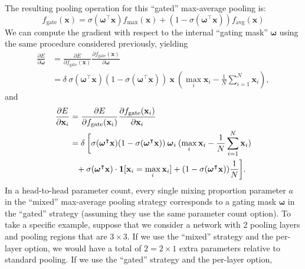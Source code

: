 \documentclass[twoside]{article}
\begin{document}
The resulting pooling operation for this ``gated'' max-average pooling is:  
{\footnotesize
\begin{equation}
   f_{\text{gate}}(\mathbf{\mathbf{x}}) = \sigma (\boldsymbol{\omega}^\intercal \mathbf{x}) f_{\text{max}}({\mathbf{x}})   + (1-\sigma(\boldsymbol{\omega}^\intercal \mathbf{x})) f_{\text{avg}}({\mathbf{x}})
\end{equation}
}%
We can compute the gradient with respect to the internal ``gating mask'' $\boldsymbol{\omega}$ 
using the same procedure considered previously, yielding
{\scriptsize
\begin{align}
      \frac{\partial E}{\partial \boldsymbol{\omega}}
     &= \frac{\partial E}{\partial f_{\text{gate}}(\mathbf{x})} 
         \frac{\partial f_{\text{gate}}(\mathbf{x})}{\partial \boldsymbol{\omega}} \\
       &= \delta \: \sigma(\boldsymbol{\omega}^\intercal \mathbf{x}) (1-\sigma(\boldsymbol{\omega}^\intercal \mathbf{x})) \: \mathbf{x} \: (\max_i{{\mathbf{x}}_i} - \frac{1}{N}\sum^{N}_{i=1}{{\mathbf{x}}_i}),
\end{align}
}%
and
{\scriptsize
\begin{align}
\frac{\partial E}{\partial \mathbf{x}_{i}}  &= \frac{\partial E}{\partial f_\text{gate}(\mathbf{x}_{i})} 
         \frac{\partial f_\text{gate}(\mathbf{x}_{i})}{\partial \mathbf{x}_{i}} \\
&= \delta \: \bigg[\sigma(\boldsymbol{\omega}^\intercal \mathbf{x}) (1-\sigma(\boldsymbol{\omega}^\intercal \mathbf{x})) \: \boldsymbol{\omega}_{i} \: (\max_i{{\mathbf{x}}_i} - \frac{1}{N}\sum^{N}_{i=1}{{\mathbf{x}}_i}) \\
& \hspace{2.7mm}  + \sigma(\boldsymbol{\omega}^\intercal \mathbf{x})\cdot\mathbf{1}[\mathbf{x}_{i} = \max_i{{\mathbf{x}}_i}] + (1-\sigma(\boldsymbol{\omega}^\intercal \mathbf{x})) \frac{1}{N}\bigg]. \nonumber
\end{align}
}%
In a head-to-head parameter count, every single mixing proportion parameter $a$ in the ``mixed''
max-average pooling strategy corresponds to a gating mask $\boldsymbol{\omega}$ in the ``gated'' strategy (assuming they use 
the same parameter count option). To take a specific example, suppose that we consider a 
network with 2 pooling layers and pooling regions that are $3 \times 3$. If we use the ``mixed'' 
strategy and the per-layer option, we would have a total of $2 = 2\times 1$ extra parameters relative
to standard pooling. If we use the ``gated'' strategy and the per-layer option, 
\end{document}
